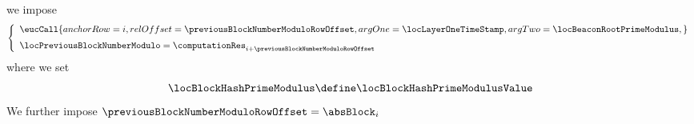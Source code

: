 \item[\underline{Computing the previous block number modulo $\locBlockHashPrimeModulusValue$:}]
	we impose
	\[
		\left\{ \begin{array}{l}
			\eucCall {
				anchorRow = i                                   ,
				relOffset = \previousBlockNumberModuloRowOffset ,
				argOne    = \locLayerOneTimeStamp               ,
				argTwo    = \locBeaconRootPrimeModulus          ,
			}
			\vspace{2mm} \\
			\locPreviousBlockNumberModulo = \computationRes _{i + \previousBlockNumberModuloRowOffset} \\
		\end{array} \right.
	\]
	where we set
	\[
		\locBlockHashPrimeModulus \define \locBlockHashPrimeModulusValue
	\]
	We further impose $\previousBlockNumberModuloRowOffset = \absBlock _{i}$
